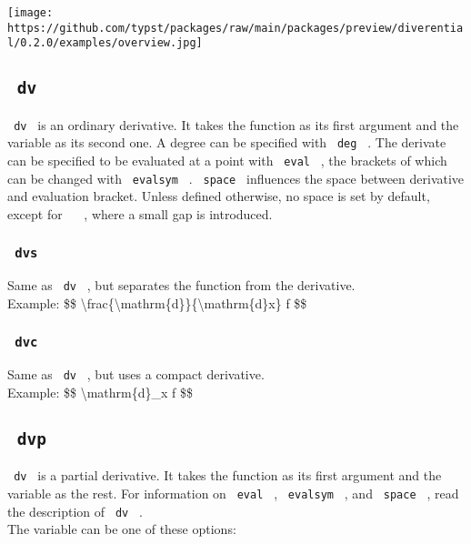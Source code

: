 \texttt{[image: https://github.com/typst/packages/raw/main/packages/preview/diverential/0.2.0/examples/overview.jpg]}

\subsection{\texorpdfstring{\texttt{\ dv\ }}{ dv }}\label{dv}

\texttt{\ dv\ } is an ordinary derivative. It takes the function as its
first argument and the variable as its second one. A degree can be
specified with \texttt{\ deg\ } . The derivate can be specified to be
evaluated at a point with \texttt{\ eval\ } , the brackets of which can
be changed with \texttt{\ evalsym\ } . \texttt{\ space\ } influences the
space between derivative and evaluation bracket. Unless defined
otherwise, no space is set by default, except for
\texttt{\ \textbar{}\ } , where a small gap is introduced.

\subsubsection{\texorpdfstring{\texttt{\ dvs\ }}{ dvs }}\label{dvs}

Same as \texttt{\ dv\ } , but separates the function from the
derivative.\\
Example: \$\$
\textbackslash frac\{\textbackslash mathrm\{d\}\}\{\textbackslash mathrm\{d\}x\}
f \$\$

\subsubsection{\texorpdfstring{\texttt{\ dvc\ }}{ dvc }}\label{dvc}

Same as \texttt{\ dv\ } , but uses a compact derivative.\\
Example: \$\$ \textbackslash mathrm\{d\}\_x f \$\$

\subsection{\texorpdfstring{\texttt{\ dvp\ }}{ dvp }}\label{dvp}

\texttt{\ dv\ } is a partial derivative. It takes the function as its
first argument and the variable as the rest. For information on
\texttt{\ eval\ } , \texttt{\ evalsym\ } , and \texttt{\ space\ } , read
the description of \texttt{\ dv\ } .\\
The variable can be one of these options:

